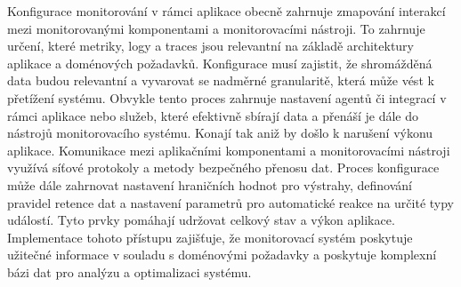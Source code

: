 Konfigurace monitorování v rámci aplikace obecně zahrnuje zmapování interakcí mezi monitorovanými komponentami a monitorovacími nástroji. To zahrnuje určení, které metriky, logy a traces jsou relevantní na základě architektury aplikace a doménových požadavků. Konfigurace musí zajistit, že shromážděná data budou relevantní a vyvarovat se nadměrné granularitě, která může vést k přetížení systému. \cite{Blanco2023} Obvykle tento proces zahrnuje nastavení agentů či integrací v rámci aplikace nebo služeb, které efektivně sbírají data a přenáší je dále do nástrojů monitorovacího systému. Konají tak aniž by došlo k narušení výkonu aplikace. Komunikace mezi aplikačními komponentami a monitorovacími nástroji využívá síťové protokoly a metody bezpečného přenosu dat. Proces konfigurace může dále zahrnovat nastavení hraničních hodnot pro výstrahy, definování pravidel retence dat a nastavení parametrů pro automatické reakce na určité typy událostí. Tyto prvky pomáhají udržovat celkový stav a výkon aplikace. \cite{Blanco2023} Implementace tohoto přístupu zajišťuje, že monitorovací systém poskytuje užitečné informace v souladu s doménovými požadavky a poskytuje komplexní bázi dat pro analýzu a optimalizaci systému.